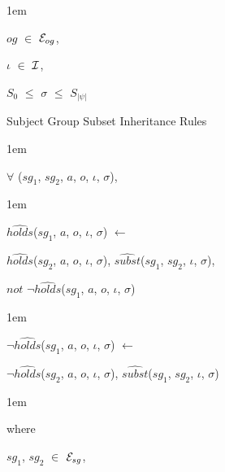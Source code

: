 \documentclass[11pt]{report}
\newenvironment{vquote}
{
  \begin{list}{}{\leftmargin 1em}\item[]
}
{
  \end{list}
}
\begin{document}
\begin{enumerate}
\begin{vquote}
                    \hspace{1em}
                    $og$ $\in$ ${\cal E}_{og}$,

                    \hspace{1em}
                    $\iota$ $\in$ ${\cal I}$,

                    \hspace{1em}
                    $S_{0}$ $\leq$ $\sigma$ $\leq$ $S_{|\psi|}$
                  \end{vquote}

                \item
                  Subject Group Subset Inheritance Rules

                  \begin{vquote}
                    $\forall$ ($sg_1$, $sg_2$, $a$, $o$, $\iota$, $\sigma$),
                  \end{vquote}

                  \begin{vquote}
                    $\hat{holds}$($sg_1$, $a$, $o$, $\iota$, $\sigma$)
                    $\leftarrow$

                    \hspace{1em}
                    $\hat{holds}$($sg_2$, $a$, $o$, $\iota$, $\sigma$),
                    $\hat{subst}$($sg_1$, $sg_2$, $\iota$, $\sigma$),

                    \hspace{1em}
                    $not$ $\lnot\hat{holds}$($sg_1$, $a$, $o$, $\iota$, $\sigma$)
                  \end{vquote}

                  \begin{vquote}
                    $\lnot\hat{holds}$($sg_1$, $a$, $o$, $\iota$, $\sigma$)
                    $\leftarrow$

                    \hspace{1em}
                    $\lnot\hat{holds}$($sg_2$, $a$, $o$, $\iota$, $\sigma$),
                    $\hat{subst}$($sg_1$, $sg_2$, $\iota$, $\sigma$)
                  \end{vquote}

                  \begin{vquote}
                    where

                    \hspace{1em}
                    $sg_1$, $sg_2$ $\in$ ${\cal E}_{sg}$,


\end{vquote}
\end{enumerate}
\end{document}
